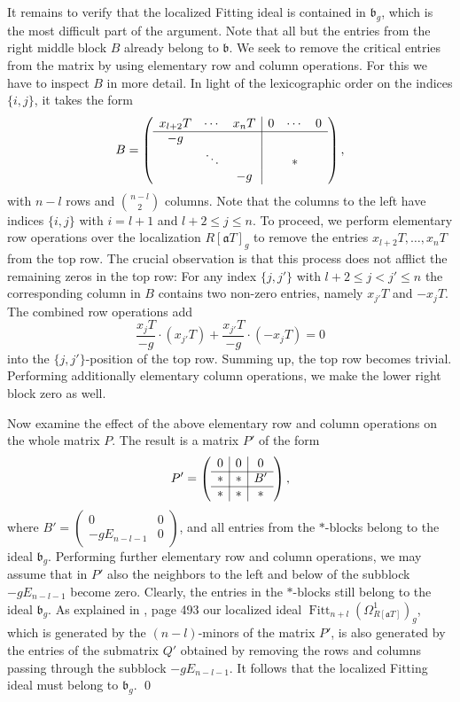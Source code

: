 \documentclass[oneside, 12pt]{amsart}
\theoremstyle{definition}
\theoremstyle{remark}
\newcommand{\ideala}{\mathfrak{a}}
\newcommand{\idealb}{\mathfrak{b}}
\newcommand{\Fitt}{\operatorname{Fitt}}
\begin{document}
It remains to  verify that the localized Fitting ideal is contained in $\idealb_g$, which is the most difficult part of the argument. 
Note that all but the entries from the right middle block $B$ already belong to $\idealb$. We seek to remove the critical entries
from the matrix by using elementary row and column operations.
For this we have to inspect $B$ in more detail. In light of the lexicographic order on the indices $\{i,j\}$,
it takes  the form
$$
B=
\left(
\begin{array}{ccc|ccc}
x_{l+2}T 	& \cdots	& x_nT 	& 0	& \cdots	& 0\\
\cline{1-6}
-g		&		&		&	&		&\\
		& \ddots	&		&	&	\ast	&\\
		&		& -g		&	&		&		
\end{array}
\right),
$$
with $n-l$ rows and $\binom{n-l}{2}$ columns. Note that the columns to the left have indices $\{i,j\}$ with $i=l+1$
and $l+2\leq j\leq n$.
To proceed, we perform elementary row operations over the localization $R[\ideala T]_g$ 
to remove the entries $x_{l+2}T,\ldots,x_nT$ from the top row.
The crucial observation is that this process does not afflict  the remaining zeros in the top row:
For any index $\{j,j'\}$ with  $l+2\leq j<j'\leq n$ the corresponding column in $B$ contains two non-zero entries, namely $x_{j'}T$ and $-x_jT$.
The combined row operations add  
$$
\frac{x_jT}{-g} \cdot (x_{j'}T) + \frac{x_{j'}T}{-g} \cdot (-x_jT)=0
$$
into  the $\{j,j'\}$-position of the top row. Summing up,  the top row becomes trivial.
Performing additionally  elementary column operations, we make the lower right block zero as well.

Now examine the effect of the above elementary row and column operations on  the whole matrix $P$.
The result is a matrix $P'$ of the form
$$
P'=
\left(
\begin{array}{c|c|c}
0	& 0	& 0\\
\cline{1-3}
\ast	& \ast	& B'\\
\cline{1-3}
\ast	& \ast	& \ast
\end{array}
\right),
$$
where $B'=(\begin{smallmatrix}0&0\\-gE_{n-l-1}& 0 \end{smallmatrix})$, and 
all entries from the $\ast$-blocks   belong to the ideal $\idealb_g$.  
Performing further elementary row and column operations, we may assume that in $P'$ also the neighbors 
to the left and below of the  subblock $-gE_{n-l-1}$ become zero. Clearly, the entries in the $\ast$-blocks
still belong to the ideal $\idealb_g$.
As explained in \cite{Eisenbud 1995}, page 493 our localized ideal
$\Fitt_{n+l}(\Omega^1_{R[\ideala T]})_g$, which
is generated by the $(n-l)$-minors of the matrix $P'$,
is also generated by the entries of the submatrix $Q'$ obtained by removing the rows and columns   passing through the subblock $-gE_{n-l-1}$.
It follows that the localized Fitting ideal must belong to $\idealb_g$.
\qed
\end{document}
